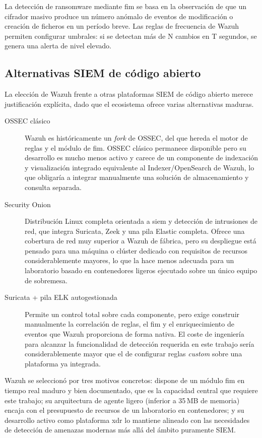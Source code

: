 \documentclass[../main.tex]{subfiles}
\begin{document}
La detección de ransomware mediante \gls{fim} se basa en la observación de
que un cifrador masivo produce un número anómalo de eventos de modificación
o creación de ficheros en un período breve. Las reglas de frecuencia de
Wazuh permiten configurar umbrales: si se detectan más de N cambios en T
segundos, se genera una alerta de nivel elevado.

\subsection{Alternativas SIEM de código abierto}

La elección de Wazuh frente a otras plataformas SIEM de código abierto
merece justificación explícita, dado que el ecosistema ofrece varias
alternativas maduras.

\begin{description}
  \item[OSSEC clásico] Wazuh es históricamente un \textit{fork} de OSSEC,
  del que hereda el motor de reglas y el módulo de \gls{fim}. OSSEC
  clásico permanece disponible pero su desarrollo es mucho menos activo y
  carece de un componente de indexación y visualización integrado
  equivalente al Indexer/OpenSearch de Wazuh, lo que obligaría a integrar
  manualmente una solución de almacenamiento y consulta separada.

  \item[Security Onion] Distribución Linux completa orientada a
  \gls{siem} y detección de intrusiones de red, que integra Suricata, Zeek
  y una pila Elastic completa. Ofrece una cobertura de red muy superior a
  Wazuh de fábrica, pero su despliegue está pensado para una máquina o
  clúster dedicado con requisitos de recursos considerablemente mayores,
  lo que la hace menos adecuada para un laboratorio basado en contenedores
  ligeros ejecutado sobre un único equipo de sobremesa.

  \item[Suricata + pila ELK autogestionada] Permite un control total sobre
  cada componente, pero exige construir manualmente la correlación de
  reglas, el \gls{fim} y el enriquecimiento de eventos que Wazuh
  proporciona de forma nativa. El coste de ingeniería para alcanzar la
  funcionalidad de detección requerida en este trabajo sería
  considerablemente mayor que el de configurar reglas \textit{custom}
  sobre una plataforma ya integrada.
\end{description}

Wazuh se seleccionó por tres motivos concretos: dispone de un módulo
\gls{fim} en tiempo real maduro y bien documentado, que es la capacidad
central que requiere este trabajo; su arquitectura de agente ligero
(inferior a 35\,MB de memoria) encaja con el presupuesto de recursos de un
laboratorio en contenedores; y su desarrollo activo como plataforma
\gls{xdr} lo mantiene alineado con las necesidades de detección de
amenazas modernas más allá del ámbito puramente SIEM.
\end{document}
